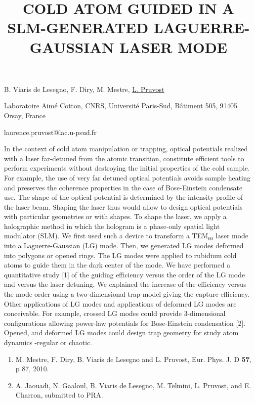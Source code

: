 \title{COLD ATOM GUIDED IN A SLM-GENERATED LAGUERRE-GAUSSIAN LASER MODE}

B. Viaris de Lesegno, F. Diry, M. Mestre, \underline{L. Pruvost}

{\normalsize{
\vspace{-4mm}Laboratoire Aim\'e Cotton, CNRS, Universit\'e Paris-Sud, B\^atiment 505, 91405 Orsay, France

\email laurence.pruvost@lac.u-psud.fr}}

In the context of cold atom manipulation or trapping, optical potentials realized with a laser
far-detuned from the atomic transition, constitute efficient tools to perform experiments
without destroying the initial properties of the cold sample. For example, the use of very far
detuned optical potentials avoids sample heating and preserves the coherence properties in the
case of Bose-Einstein condensate use.
The shape of the optical potential is determined by the intensity profile of the laser beam.
Shaping the laser thus would allow to design optical potentials with particular geometries or
with shapes. To shape the laser, we apply a holographic method in which the hologram is a
phase-only spatial light modulator (SLM). We first used such a device to transform a TEM$_{00}$
laser mode into a Laguerre-Gaussian (LG) mode. Then, we generated LG modes deformed
into polygons or opened rings.
The LG modes were applied to rubidium cold atoms to guide them in the dark center of the
mode. We have performed a quantitative study [1] of the guiding efficiency versus the order
of the LG mode and versus the laser detuning. We explained the increase of the efficiency
versus the mode order using a two-dimensional trap model giving the capture efficiency.
Other applications of LG modes and applications of deformed LG modes are conceivable. For
example, crossed LG modes could provide 3-dimensional configurations allowing power-law
potentials for Bose-Einstein condensation [2]. Opened, and deformed LG modes could design
trap geometry for study atom dynamics -regular or chaotic.

\begin{enumerate}
\item M. Mestre, F. Diry, B. Viaris de Lesegno and L. Pruvost, Eur. Phys. J. D \textbf{57}, p 87, 2010.
\item A. Jaouadi, N. Gaaloul, B. Viaris de Lesegno, M. Telmini, L. Pruvost, and E. Charron, submitted to PRA.
\end{enumerate}

\vspace{\baselineskip} 